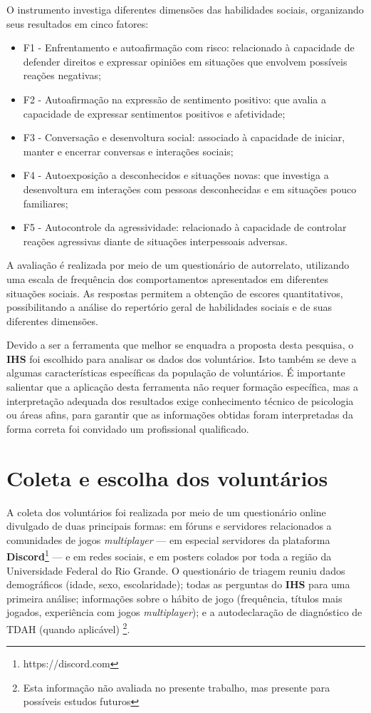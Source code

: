             O instrumento investiga diferentes dimensões das habilidades sociais, organizando seus resultados em cinco fatores:
            \begin{itemize}
                \item F1 - Enfrentamento e autoafirmação com risco: relacionado à capacidade de defender direitos e expressar opiniões em situações que envolvem possíveis reações negativas;
                \item F2 - Autoafirmação na expressão de sentimento positivo: que avalia a capacidade de expressar sentimentos positivos e afetividade;
                \item F3 - Conversação e desenvoltura social: associado à capacidade de iniciar, manter e encerrar conversas e interações sociais;
                \item F4 - Autoexposição a desconhecidos e situações novas: que investiga a desenvoltura em interações com pessoas desconhecidas e em situações pouco familiares;
                \item F5 - Autocontrole da agressividade: relacionado à capacidade de controlar reações agressivas diante de situações interpessoais adversas.
            \end{itemize}

        A avaliação é realizada por meio de um questionário de autorrelato, utilizando uma escala de frequência dos comportamentos apresentados em diferentes situações sociais. As respostas permitem a obtenção de escores quantitativos, possibilitando a análise do repertório geral de habilidades sociais e de suas diferentes dimensões.

        Devido a ser a ferramenta que melhor se enquadra a proposta desta pesquisa, o \textbf{IHS} foi escolhido para analisar os dados dos voluntários. Isto também se deve a algumas características específicas da população de voluntários. É importante salientar que a aplicação desta ferramenta não requer formação específica, mas a interpretação adequada dos resultados exige conhecimento técnico de psicologia ou áreas afins, para garantir que as informações obtidas foram interpretadas da forma correta foi convidado um profissional qualificado.

    \section{Coleta e escolha dos voluntários}
    A coleta dos voluntários foi realizada por meio de um questionário online divulgado de duas principais formas: em fóruns e servidores relacionados a comunidades de jogos \textit{multiplayer} — em especial servidores da plataforma \textbf{Discord}\footnote{https://discord.com} — e em redes sociais, e em posters colados por toda a região da Universidade Federal do Rio Grande. O questionário de triagem reuniu dados demográficos (idade, sexo, escolaridade); todas as perguntas do \textbf{IHS} para uma primeira análise; informações sobre o hábito de jogo (frequência, títulos mais jogados, experiência com jogos \textit{multiplayer}); e a autodeclaração de diagnóstico de TDAH (quando aplicável) \footnote{Esta informação não avaliada no presente trabalho, mas presente para possíveis estudos futuros}.



